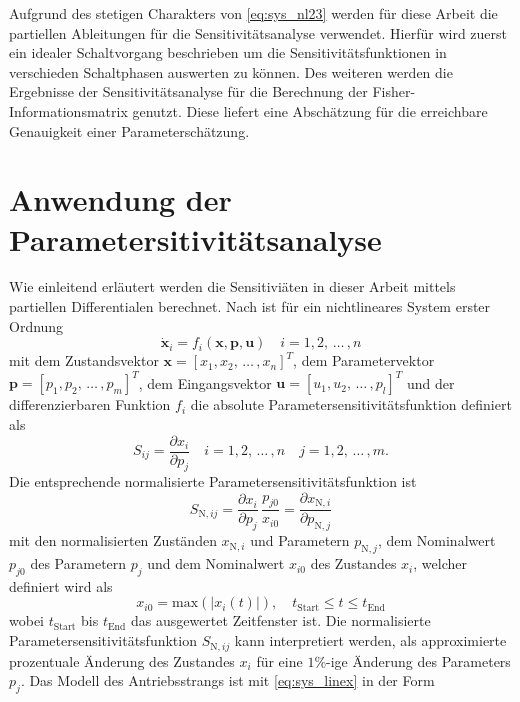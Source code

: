 Aufgrund des stetigen Charakters von \eqref{eq:sys_nl23} werden für diese Arbeit die partiellen Ableitungen für die Sensitivitätsanalyse verwendet.
Hierfür wird zuerst ein idealer Schaltvorgang beschrieben um die Sensitivitätsfunktionen in verschieden Schaltphasen auswerten zu können. Des weiteren werden die Ergebnisse der Sensitivitätsanalyse für die Berechnung der Fisher-Informationsmatrix genutzt. Diese liefert eine Abschätzung für die erreichbare Genauigkeit einer Parameterschätzung.
   

\section{Anwendung der Parametersitivitätsanalyse}\label{sec:para_sens}
Wie einleitend erläutert werden die Sensitiviäten in dieser Arbeit mittels partiellen Differentialen berechnet. Nach \cite{Hearne.1985} ist für ein nichtlineares System erster Ordnung
\begin{equation}
\dot{\pmb{x}}_i = f_i(\pmb{x},\pmb{p},\pmb{u})\quad i=1,2,\,\dots\, ,n 
\end{equation}
mit dem Zustandsvektor $\pmb{x} = [x_1, x_2,\, \dots\, ,x_n]^T$, dem Parametervektor $\pmb{p} = [p_1, p_2,\, \dots\, ,p_m]^T$, dem Eingangsvektor $\pmb{u} = [u_1, u_2,\, \dots\, ,p_l]^T$ und der differenzierbaren Funktion $f_i$ die absolute Parametersensitivitätsfunktion definiert als
\begin{equation}\label{eq:abs_psens}
S_{ij} = \frac{\partial x_i}{\partial p_j} \quad i=1,2,\,\dots\, ,n \quad j=1,2,\,\dots\, ,m.
\end{equation}
Die entsprechende normalisierte Parametersensitivitätsfunktion ist 
\begin{equation}
S_{\mathrm{N},ij} = \frac{\partial x_i}{\partial p_j}\, \frac{p_{j0}}{x_{i0}} = \frac{\partial x_{\mathrm{N},i}}{\partial p_{\mathrm{N},j}}
\end{equation}
mit den normalisierten Zuständen $x_{\mathrm{N},i}$ und Parametern $p_{\mathrm{N},j}$, dem Nominalwert $p_{j0}$ des Parametern $p_{j}$ und dem Nominalwert $x_{i0}$ des  Zustandes $x_{i}$, welcher definiert wird als
\begin{equation}
 x_{i0} = \mathrm{max}\left( \left|x_{i}(t)\right|\right),\quad t_\mathrm{Start}\leq t \leq t_\mathrm{End}
\end{equation}
wobei $t_\mathrm{Start}$ bis $t_\mathrm{End}$ das ausgewertet Zeitfenster ist.
Die normalisierte Parametersensitivitätsfunktion $S_{\mathrm{N},ij}$ kann interpretiert werden, als approximierte prozentuale Änderung des Zustandes $x_i$ für eine $1\%$-ige Änderung des Parameters $p_j$. Das Modell des Antriebsstrangs ist mit \eqref{eq:sys_linex} in der Form
